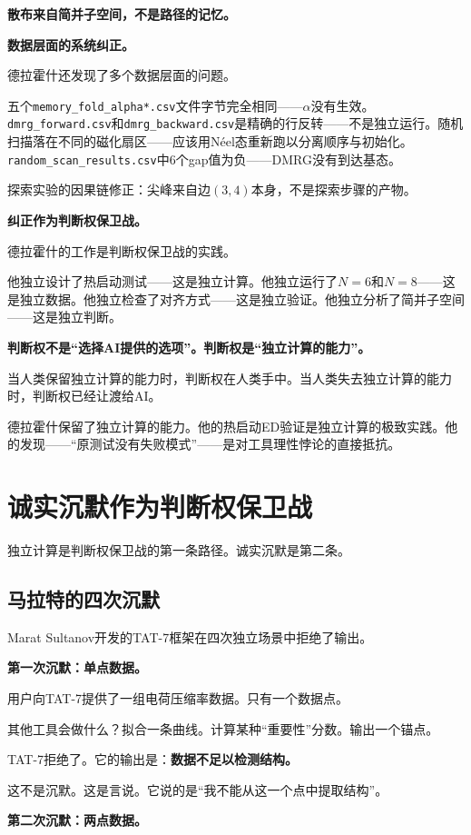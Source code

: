 \documentclass[11pt,a4paper]{book}
\theoremstyle{definition}
\begin{document}
\textbf{散布来自简并子空间，不是路径的记忆。}

\textbf{数据层面的系统纠正。}

德拉霍什还发现了多个数据层面的问题。

五个\texttt{memory\_fold\_alpha*.csv}文件字节完全相同——$\alpha$没有生效。\texttt{dmrg\_forward.csv}和\texttt{dmrg\_backward.csv}是精确的行反转——不是独立运行。随机扫描落在不同的磁化扇区——应该用Néel态重新跑以分离顺序与初始化。\texttt{random\_scan\_results.csv}中6个gap值为负——DMRG没有到达基态。

探索实验的因果链修正：尖峰来自边$(3,4)$本身，不是探索步骤的产物。

\textbf{纠正作为判断权保卫战。}

德拉霍什的工作是判断权保卫战的实践。

他独立设计了热启动测试——这是独立计算。他独立运行了$N=6$和$N=8$——这是独立数据。他独立检查了对齐方式——这是独立验证。他独立分析了简并子空间——这是独立判断。

\textbf{判断权不是“选择AI提供的选项”。判断权是“独立计算的能力”。}

当人类保留独立计算的能力时，判断权在人类手中。当人类失去独立计算的能力时，判断权已经让渡给AI。

德拉霍什保留了独立计算的能力。他的热启动ED验证是独立计算的极致实践。他的发现——“原测试没有失败模式”——是对工具理性悖论的直接抵抗。

\section{诚实沉默作为判断权保卫战}

独立计算是判断权保卫战的第一条路径。诚实沉默是第二条。

\subsection{马拉特的四次沉默}

Marat Sultanov开发的TAT-7框架在四次独立场景中拒绝了输出。

\textbf{第一次沉默：单点数据。}

用户向TAT-7提供了一组电荷压缩率数据。只有一个数据点。

其他工具会做什么？拟合一条曲线。计算某种“重要性”分数。输出一个锚点。

TAT-7拒绝了。它的输出是：\textbf{数据不足以检测结构。}

这不是沉默。这是言说。它说的是“我不能从这一个点中提取结构”。

\textbf{第二次沉默：两点数据。}
\end{document}

